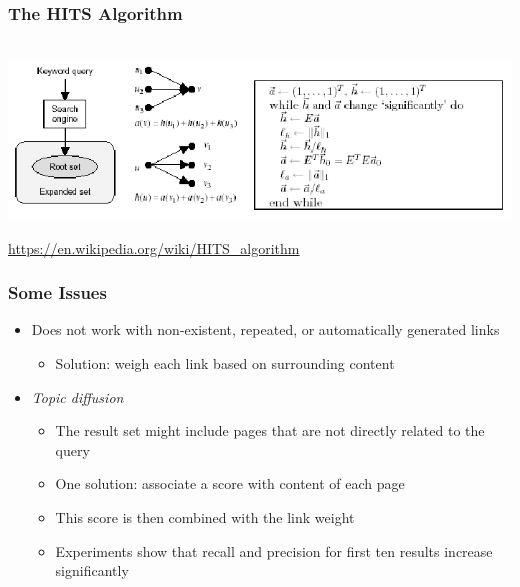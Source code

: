 \documentclass{beamer}
\begin{document}

\begin{frame}
  \frametitle{The HITS Algorithm}

  ~\hspace{-.5cm}\includegraphics[width=1.2\linewidth]{hits}

\href{https://en.wikipedia.org/wiki/HITS_algorithm}  {\url{https://en.wikipedia.org/wiki/HITS_algorithm}}


\end{frame}

\begin{frame}
    \frametitle{Some Issues}
    \begin{itemize}
    \item Does not work with non-existent, repeated, or automatically generated
        links
        \begin{itemize}
        \item Solution: weigh each link based on surrounding content
        \end{itemize}
    \item \emph{Topic diffusion}
        \begin{itemize}
        \item The result set might include pages that are not directly related
            to the query
        \item One solution: associate a score with content of each page
        \item This score is then combined with the link weight
        \item Experiments show that recall and precision for first ten results
            increase significantly
        \end{itemize}
    \end{itemize}
\end{frame}

\end{document}
